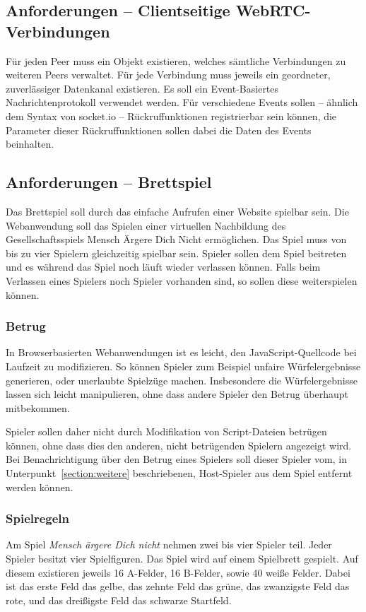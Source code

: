 \subsection{Anforderungen -- Clientseitige WebRTC-Verbindungen}
Für jeden Peer muss ein Objekt existieren, welches sämtliche Verbindungen zu weiteren Peers verwaltet. Für jede Verbindung muss jeweils ein geordneter, zuverlässiger Datenkanal existieren. Es soll ein Event-Basiertes Nachrichtenprotokoll verwendet werden. Für verschiedene Events sollen -- ähnlich dem Syntax von socket.io -- Rückruffunktionen registrierbar sein können, die Parameter dieser Rückruffunktionen sollen dabei die Daten des Events beinhalten.

\subsection{Anforderungen -- Brettspiel}
Das Brettspiel soll durch das einfache Aufrufen einer Website spielbar sein. Die Webanwendung soll das Spielen einer virtuellen Nachbildung des Gesellschaftsspiels \glqq{}Mensch Ärgere Dich Nicht\grqq{} ermöglichen. Das Spiel muss von bis zu vier Spielern gleichzeitig spielbar sein. Spieler sollen dem Spiel beitreten und es während das Spiel noch läuft wieder verlassen können. Falls beim Verlassen eines Spielers noch Spieler vorhanden sind, so sollen diese weiterspielen können. 

\subsubsection{Betrug}
In Browserbasierten Webanwendungen ist es leicht, den JavaScript-Quellcode bei Laufzeit zu modifizieren. So können Spieler zum Beispiel unfaire Würfelergebnisse generieren, oder unerlaubte Spielzüge machen. Insbesondere die Würfelergebnisse lassen sich leicht manipulieren, ohne dass andere Spieler den Betrug überhaupt mitbekommen.\par

Spieler sollen daher nicht durch Modifikation von Script-Dateien betrügen können, ohne dass dies den anderen, nicht betrügenden Spielern angezeigt wird. Bei Benachrichtigung über den Betrug eines Spielers soll dieser Spieler vom, in Unterpunkt~\ref{section:weitere} beschriebenen, \glqq{}Host\grqq{}-Spieler aus dem Spiel entfernt werden können.\par

\subsubsection{Spielregeln}
Am Spiel \textit{Mensch ärgere Dich nicht} nehmen zwei bis vier Spieler teil. Jeder Spieler besitzt vier Spielfiguren. Das Spiel wird auf einem Spielbrett gespielt. Auf diesem existieren jeweils 16 A-Felder, 16 B-Felder, sowie 40 weiße Felder. Dabei ist das erste Feld das gelbe, das zehnte Feld das grüne, das zwanzigste Feld das rote, und das dreißigste Feld das schwarze Startfeld.\par 

